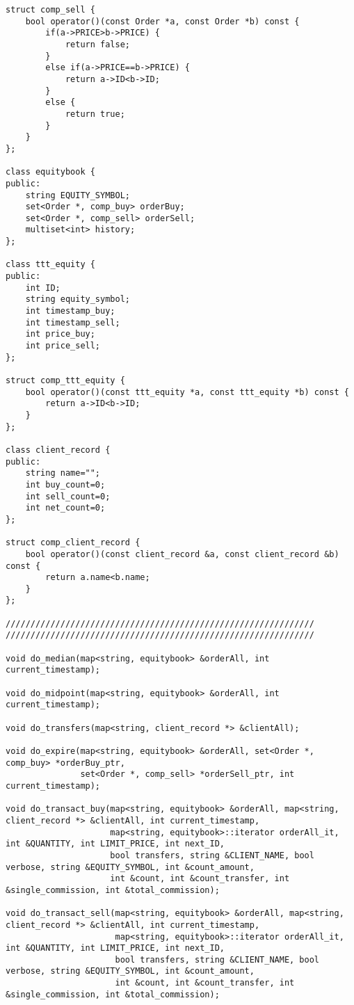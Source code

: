 \documentclass{article}
\begin{document}
\begin{spacing}{1.5}
\begin{lstlisting}
struct comp_sell {
    bool operator()(const Order *a, const Order *b) const {
        if(a->PRICE>b->PRICE) {
            return false;
        }
        else if(a->PRICE==b->PRICE) {
            return a->ID<b->ID;
        }
        else {
            return true;
        }
    }
};

class equitybook {
public:
    string EQUITY_SYMBOL;
    set<Order *, comp_buy> orderBuy;
    set<Order *, comp_sell> orderSell;
    multiset<int> history;
};

class ttt_equity {
public:
    int ID;
    string equity_symbol;
    int timestamp_buy;
    int timestamp_sell;
    int price_buy;
    int price_sell;
};

struct comp_ttt_equity {
    bool operator()(const ttt_equity *a, const ttt_equity *b) const {
        return a->ID<b->ID;
    }
};

class client_record {
public:
    string name="";
    int buy_count=0;
    int sell_count=0;
    int net_count=0;
};

struct comp_client_record {
    bool operator()(const client_record &a, const client_record &b) const {
        return a.name<b.name;
    }
};

//////////////////////////////////////////////////////////////
//////////////////////////////////////////////////////////////

void do_median(map<string, equitybook> &orderAll, int current_timestamp);

void do_midpoint(map<string, equitybook> &orderAll, int current_timestamp);

void do_transfers(map<string, client_record *> &clientAll);

void do_expire(map<string, equitybook> &orderAll, set<Order *, comp_buy> *orderBuy_ptr,
               set<Order *, comp_sell> *orderSell_ptr, int current_timestamp);

void do_transact_buy(map<string, equitybook> &orderAll, map<string, client_record *> &clientAll, int current_timestamp,
                     map<string, equitybook>::iterator orderAll_it, int &QUANTITY, int LIMIT_PRICE, int next_ID,
                     bool transfers, string &CLIENT_NAME, bool verbose, string &EQUITY_SYMBOL, int &count_amount,
                     int &count, int &count_transfer, int &single_commission, int &total_commission);

void do_transact_sell(map<string, equitybook> &orderAll, map<string, client_record *> &clientAll, int current_timestamp,
                      map<string, equitybook>::iterator orderAll_it, int &QUANTITY, int LIMIT_PRICE, int next_ID,
                      bool transfers, string &CLIENT_NAME, bool verbose, string &EQUITY_SYMBOL, int &count_amount,
                      int &count, int &count_transfer, int &single_commission, int &total_commission);


\end{lstlisting}
\end{spacing}
\end{document}
